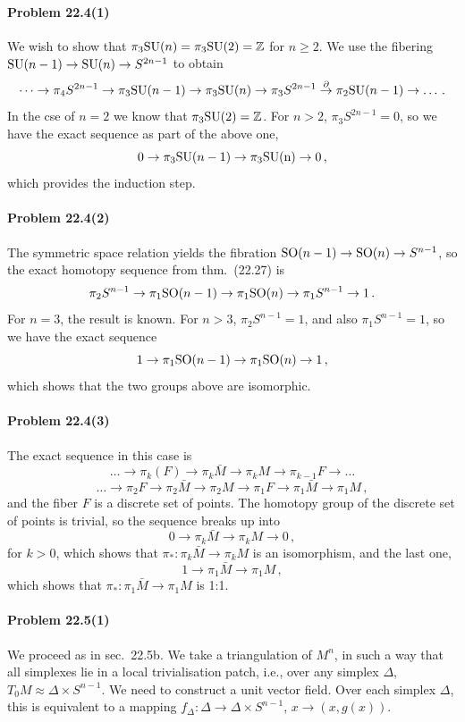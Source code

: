 \documentclass[a4paper,12pt]{article}
\newcommand{\problem}[1]{\paragraph{Problem #1}}
\begin{document}

\problem{22.4(1)} We wish to show that $\pi_3 {\rm SU}(n) = \pi_3 {\rm SU}(2) = \mathbb{Z}$ for $n\ge 2$. We use the fibering ${\rm SU}(n-1)\to {\rm SU}(n) \to S^{2n-1}$ to obtain
\[
\dots \to \pi_4 S^{2n-1} \to \pi_3 {\rm SU}(n-1) \to \pi_3 {\rm SU}(n) \to \pi_3 S^{2n -1} \overset{\partial}{\to} \pi_2 {\rm SU}(n-1)\to \dots\,.
\]
In the cse of $n=2$ we know that $\pi_3 {\rm SU}(2) = \mathbb{Z}$. For $n >2$, $\pi_3 S^{2n-1} =0$, so we have the exact sequence as part of the above one,
\[
 0 %
 \to \pi_3 {\rm SU}(n-1) \to \pi_3 {\rm SU(n)}\to 0\,,
\]
which provides the induction step.


\problem{22.4(2)} The symmetric space relation yields the fibration ${\rm SO}(n-1)\to {\rm SO}(n) \to S^{n-1}$, so the exact homotopy sequence from thm.\ (22.27) is
\[
 \pi_2 S^{n-1} \to \pi_1 {\rm SO}(n-1) \to \pi_1 {\rm SO}(n) \to \pi_1 S^{n-1} \to 1\,.
\]
For $n=3$, the result is known. For $n>3$, $\pi_2 S^{n-1} = 1$, and also $\pi_1 S^{n-1} = 1$, so we have the exact sequence
\[
 1 \to \pi_1 {\rm SO}(n-1) \to \pi_1 {\rm SO}(n) \to 1\,,
\]
which shows that the two groups above are isomorphic.


\problem{22.4(3)} The exact sequence in this case is
\[
 \dots \to \pi_k(F) \to \pi_k \bar M \to \pi_k M \to \pi_{k-1} F \to \dots
\]
\[
 \dots\to \pi_2 F \to \pi_2\bar M \to \pi_2 M \to \pi_1 F \to \pi_1 \bar M \to \pi_1 M\,,
\]
and the fiber $F$ is a discrete set of points. The homotopy group of the discrete set of points is trivial, so the sequence breaks up into
\[
 0 \to \pi_k \bar M \to \pi_k M \to 0\,,
\]
for $k>0$, which shows that $\pi_*: \pi_k \bar M \to \pi_k M$ is an isomorphism, and the last one,
\[
 1 \to \pi_1 \bar M \to \pi_1 M\,,
\]
which shows that $\pi_*: \pi_1\bar M \to \pi_1 M$ is 1:1.


\problem{22.5(1)} We proceed as in sec.\ 22.5b. We take a triangulation of $M^n$, in such a way that all simplexes lie in a local trivialisation patch, i.e., over any simplex $\Delta$, $T_0M \approx \Delta \times S^{n-1}$. We need to construct a unit vector field. Over each simplex $\Delta$, this is equivalent to a mapping $f_\Delta: \Delta \to \Delta \times S^{n-1}$, $x\to (x, g(x))$.
\end{document}
